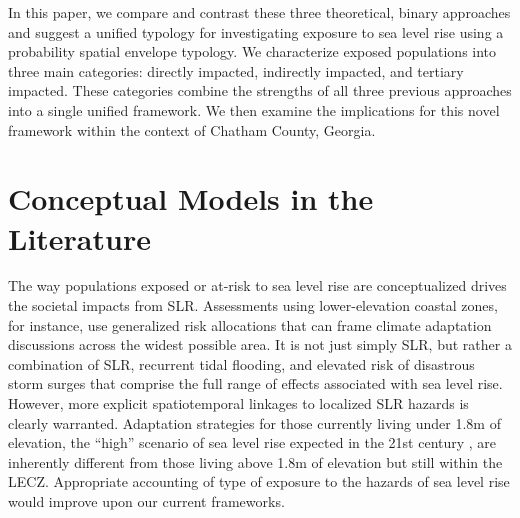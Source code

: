 \documentclass[12pt,]{article}
\begin{document}
In this paper, we compare and contrast these three theoretical, binary
approaches and suggest a unified typology for investigating exposure to
sea level rise using a probability spatial envelope typology. We
characterize exposed populations into three main categories: directly
impacted, indirectly impacted, and tertiary impacted. These categories
combine the strengths of all three previous approaches into a single
unified framework. We then examine the implications for this novel
framework within the context of Chatham County, Georgia.

\hypertarget{conceptual-models-in-the-literature}{%
\section{Conceptual Models in the
Literature}\label{conceptual-models-in-the-literature}}

The way populations exposed or at-risk to sea level rise are
conceptualized drives the societal impacts from SLR. Assessments using
lower-elevation coastal zones, for instance, use generalized risk
allocations that can frame climate adaptation discussions across the
widest possible area. It is not just simply SLR, but rather a
combination of SLR, recurrent tidal flooding, and elevated risk of
disastrous storm surges that comprise the full range of effects
associated with sea level rise. However, more explicit spatiotemporal
linkages to localized SLR hazards is clearly warranted. Adaptation
strategies for those currently living under 1.8m of elevation, the
``high'' scenario of sea level rise expected in the 21st century
\citep{sweet2017global}, are inherently different from those living
above 1.8m of elevation but still within the LECZ. Appropriate
accounting of type of exposure to the hazards of sea level rise would
improve upon our current frameworks.
\end{document}
